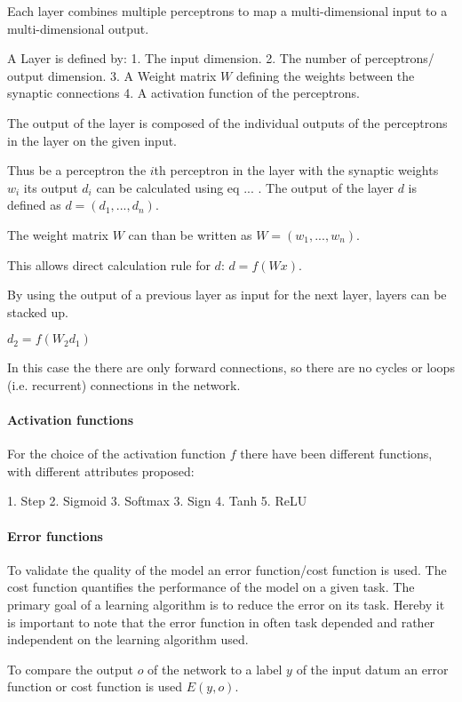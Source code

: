 Each layer combines multiple perceptrons to map a multi-dimensional input to a multi-dimensional output.

A Layer is defined by:
1. The input dimension.
2. The number of perceptrons/ output dimension.
3. A Weight matrix $W$ defining the weights between the synaptic connections
4. A activation function of the perceptrons.


The output of the layer is composed of the individual outputs of the perceptrons in the layer on the given input.

Thus be a perceptron the $i$th perceptron in the layer with the synaptic weights $w_i$ its output $d_i$ can be calculated using eq ... . 
The output of the layer $d$ is defined as $d = (d_1, ... ,d_n)$. 

The weight matrix $W$ can than be written as $W = (w_1, ... ,w_n)$. 

This allows direct calculation rule for $d$: $d = f (W x ) $.

By using the output of a previous layer as input for the next layer, layers can be stacked up. 

$d_2 = f (W_2 d_1)$

In this case the there are only forward connections, so there are no cycles or loops (i.e. recurrent) connections in the network.

\paragraph{Activation functions}

For the choice of the activation function $f$ there have been different functions, with different attributes proposed:

1. Step
2. Sigmoid
3. Softmax
3. Sign
4. Tanh
5. ReLU

\paragraph{Error functions}

To validate the quality of the model an error function/cost function is used.
The cost function quantifies the performance of the model on a given task.
The primary goal of a learning algorithm is to reduce the error on its task.
Hereby it is important to note that the error function in often task depended and rather independent on the learning algorithm used.  

To compare the output $o$ of the network to a label $y$ of the input datum an error function or cost function is used $E(y,o)$.

